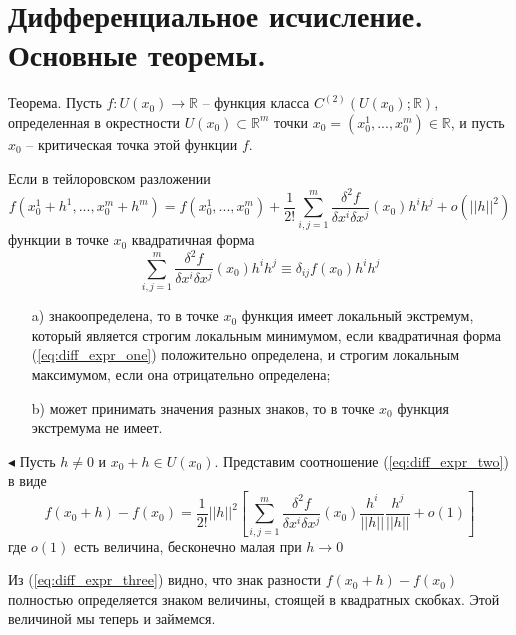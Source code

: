 \documentclass[a4paper, 12pt]{extarticle} %
\begin{document}
\clearpage
\section*{Дифференциальное исчисление. Основные теоремы.}
Теорема. Пусть $f: U(x_0) \to \mathbb{R}$ -- функция класса $C^{(2)}(U(x_0); \mathbb{R})$, определенная в окрестности $U(x_0) \subset \mathbb{R}^m$ точки $x_0 = (x^1_0, ...,x^m_0) \in \mathbb{R}$, и пусть $x_0$ -- критическая точка этой функции $f$.

Если в тейлоровском разложении
\begin{equation}
    f(x^1_0+h^1, ..., x_0^m+h^m) = f(x_0^1, ..., x^m_0) + \frac{1}{2!} \sum^m_{i, j = 1} \frac{\delta^2 f}{\delta x^i \delta x^j} (x_0)h^i h^j + o(||h||^2)
    \label{eq:diff_expr_two}
\end{equation}
функции в точке $x_0$ квадратичная форма
\begin{equation}
    \sum_{i,j = 1}^m \frac{\delta^2 f}{\delta x^i \delta x^j} (x_0) h^i h^j \equiv \delta_{ij} f(x_0) h^i h^j
    \label{eq:diff_expr_one}
\end{equation}
\begin{enumerate}
    \item [a)] знакоопределена, то в точке $x_0$ функция имеет локальный экстремум, который является строгим локальным минимумом, если квадратичная форма (\ref{eq:diff_expr_one}) положительно определена, и строгим локальным максимумом, если она отрицательно определена;
    \item [b)] может принимать значения разных знаков, то в точке $x_0$ функция экстремума не имеет.
\end{enumerate}

$ \blacktriangleleft $ Пусть $h \neq 0$ и $x_0 + h \in U(x_0)$. Представим соотношение (\ref{eq:diff_expr_two}) в виде
\begin{equation}
    f(x_0 + h) - f(x_0) = \frac{1}{2!} ||h||^2 \left[ \sum^m_{i, j = 1} \frac{\delta^2 f}{\delta x^i \delta x^j} (x_0) \frac{h^i}{||h||} \frac{h^j}{||h||} + o(1) \right]
    \label{eq:diff_expr_three}
\end{equation}
где $o(1)$ есть величина, бесконечно малая при $h \to 0$

Из (\ref{eq:diff_expr_three}) видно, что знак разности $f(x_0 + h) - f(x_0)$ полностью определяется знаком величины, стоящей в квадратных скобках. Этой величиной мы теперь и займемся.

\clearpage
\end{document}
